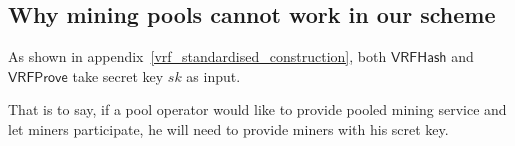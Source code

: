 \subsection{Why mining pools cannot work in our scheme}

As shown in appendix~\ref{vrf_standardised_construction}, both $\mathsf{VRFHash}$ and $\mathsf{VRFProve}$ take secret key $sk$ as input.

That is to say, if a pool operator would like to provide pooled mining service and let miners participate, he will need to provide miners with his scret key.


